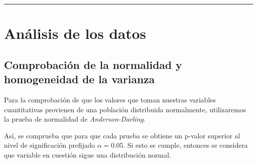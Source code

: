 \documentclass[
]{article}
\newenvironment{Shaded}{\begin{snugshade}}{\end{snugshade}}
\newcommand{\CharTok}[1]{\textcolor[rgb]{0.31,0.60,0.02}{#1}}
\newcommand{\CommentTok}[1]{\textcolor[rgb]{0.56,0.35,0.01}{\textit{#1}}}
\newcommand{\ControlFlowTok}[1]{\textcolor[rgb]{0.13,0.29,0.53}{\textbf{#1}}}
\newcommand{\DecValTok}[1]{\textcolor[rgb]{0.00,0.00,0.81}{#1}}
\newcommand{\FloatTok}[1]{\textcolor[rgb]{0.00,0.00,0.81}{#1}}
\newcommand{\KeywordTok}[1]{\textcolor[rgb]{0.13,0.29,0.53}{\textbf{#1}}}
\newcommand{\NormalTok}[1]{#1}
\newcommand{\OperatorTok}[1]{\textcolor[rgb]{0.81,0.36,0.00}{\textbf{#1}}}
\newcommand{\StringTok}[1]{\textcolor[rgb]{0.31,0.60,0.02}{#1}}
\begin{document}
\begin{center}\rule{0.5\linewidth}{0.5pt}\end{center}

\newpage

\hypertarget{anuxe1lisis-de-los-datos}{%
\section{Análisis de los datos}\label{anuxe1lisis-de-los-datos}}

\hypertarget{comprobaciuxf3n-de-la-normalidad-y-homogeneidad-de-la-varianza}{%
\subsection{Comprobación de la normalidad y homogeneidad de la
varianza}\label{comprobaciuxf3n-de-la-normalidad-y-homogeneidad-de-la-varianza}}

Para la comprobación de que los valores que toman nuestras variables
cuantitativas provienen de una población distribuida normalmente,
utilizaremos la prueba de normalidad de \emph{Anderson-Darling}.

Así, se comprueba que para que cada prueba se obtiene un p-valor
superior al nivel de significación prefijado \(\alpha = 0.05\). Si esto
se cumple, entonces se considera que variable en cuestión sigue una
distribución normal.

\begin{Shaded}
\end{Shaded}
\end{document}
